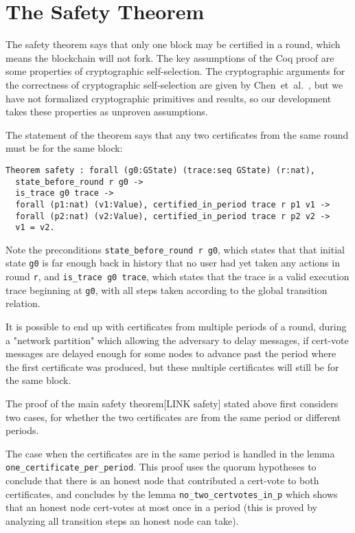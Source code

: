 \section{The Safety Theorem}
\label{sec:safety}

The safety theorem says that only one block may be certified in a round,
which means the blockchain will not fork.
The key assumptions of the Coq proof are some properties of cryptographic self-selection.
The cryptographic arguments for the correctness of cryptographic self-selection
are given by Chen~et~al.~\cite{Chen2019,Chen2018}, but we have not formalized cryptographic
primitives and results, so our development takes these properties as unproven assumptions.

The statement of the theorem says that any two certificates from the same round
must be for the same block:

\begin{lstlisting}[language=Coq]
Theorem safety : forall (g0:GState) (trace:seq GState) (r:nat),
  state_before_round r g0 ->
  is_trace g0 trace ->
  forall (p1:nat) (v1:Value), certified_in_period trace r p1 v1 ->
  forall (p2:nat) (v2:Value), certified_in_period trace r p2 v2 ->
  v1 = v2.
\end{lstlisting}

Note the preconditions \lstinline{state_before_round r g0}, which states that
that initial state \lstinline{g0} is far enough back in history that no user
had yet taken any actions in round \lstinline{r}, and \lstinline[breaklines=true]{is_trace g0 trace},
which states that the trace is a valid execution trace beginning at \lstinline{g0},
with all steps taken according to the global transition relation.

It is possible to end up with certificates from multiple periods of a round,
during a "network partition" which allowing the adversary to delay messages,
if cert-vote messages are delayed enough for some nodes to advance past the
period where the first certificate was produced, but these multiple certificates
will still be for the same block.

The proof of the main safety theorem[LINK safety] stated above first considers two
cases, for whether the two certificates are from the same period or different
periods.

The case when the certificates are in the same period is handled in the lemma
\lstinline{one_certificate_per_period}.
This proof uses the quorum hypotheses to conclude that there is an honest node
that contributed a cert-vote to both certificates,
and concludes by the lemma \lstinline{no_two_certvotes_in_p} which shows that an
honest node cert-votes at most once in a period (this is proved by analyzing
all transition steps an honest node can take).


